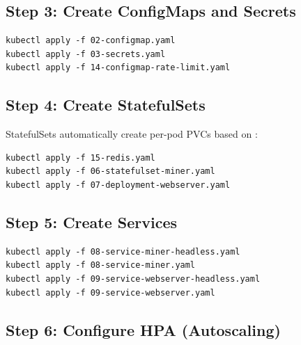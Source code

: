 \subsection{Step 3: Create ConfigMaps and Secrets}

\begin{listing}[H]
\caption{Apply Configuration and Secrets}
\label{lst:ch23-config-secrets}
\begin{verbatim}
kubectl apply -f 02-configmap.yaml
kubectl apply -f 03-secrets.yaml
kubectl apply -f 14-configmap-rate-limit.yaml
\end{verbatim}
\end{listing}

\subsection{Step 4: Create StatefulSets}

StatefulSets automatically create per-pod PVCs based on :

\begin{listing}[htbp]
\caption{Deploy StatefulSets}
\label{lst:ch23-deploy-statefulsets}
\begin{verbatim}
kubectl apply -f 15-redis.yaml
kubectl apply -f 06-statefulset-miner.yaml
kubectl apply -f 07-deployment-webserver.yaml
\end{verbatim}
\end{listing}

\subsection{Step 5: Create Services}

\begin{listing}[H]
\caption{Deploy Services for Networking}
\label{lst:ch23-deploy-services}
\begin{verbatim}
kubectl apply -f 08-service-miner-headless.yaml
kubectl apply -f 08-service-miner.yaml
kubectl apply -f 09-service-webserver-headless.yaml
kubectl apply -f 09-service-webserver.yaml
\end{verbatim}
\end{listing}

\subsection{Step 6: Configure HPA (Autoscaling)}

